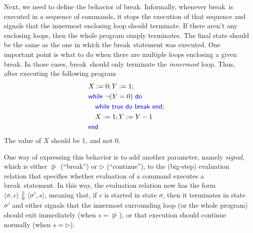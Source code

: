 \documentclass[11pt,a4paper]{article}
\let\sCont\triangleright
\let\sBreak\ntriangleright
\newcommand{\pair}[1]{\langle #1 \rangle}
\newcommand{\evalCsig}[4]{\pair{#1, #2} \Downarrow \pair{#3, #4}}
\newcommand{\kword}[1]{{\color{blue} \textsf{#1}}}
\newcommand{\True}{\kword{true}}
\newcommand{\While}{\kword{while}}
\newcommand{\Do}{\kword{do}}
\newcommand{\End}{\kword{end}}
\newcommand{\Break}{\kword{break}}
\begin{document}
Next, we need to define the behavior of \Break.
Informally, whenever \Break~is executed in a sequence of commands, it stops the execution of that sequence and signals that the innermost enclosing loop should terminate.
If there aren't any enclosing loops, then the whole program simply terminates.
The final state should be the same as the one in which the \Break~statement was executed.
One important point is what to do when there are multiple loops enclosing a given \Break.
In those cases, \Break~should only terminate the \emph{innermost} loop. 
Thus, after executing the following program
\begin{align*}
	& X:=0;Y:=1; \\
	& \While~\neg (Y = 0)~\Do \\
	& \quad \While~\True~\Do~\Break~\End; \\
	& \quad X:=1;Y:=Y-1 \\
	& \End
\end{align*}
The value of $X$ should be 1, and not 0.

One way of expressing this behavior is to add another parameter, namely \emph{signal},
which is either $\sBreak$ (``break'') or $\sCont$ (``continue''),
to the (big-step) evaluation relation that specifies whether evaluation of a command executes a \Break~statement.
In this way, the evaluation relation now has the form $\evalCsig{\sigma}{c}{\sigma'}{s}$, meaning that,
if $c$ is started in state $\sigma$, then it terminates in state $\sigma'$ and either signals that the innermost surrounding loop (or the whole program) should exit immediately (when $s=\sBreak$),
or that execution should continue normally (when $s=\sCont$).
\end{document}
